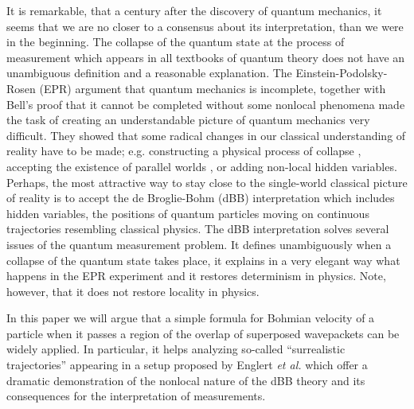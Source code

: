 \documentclass[preprint,tightenlines]{elsarticle}
\begin{document}
It is remarkable, that a century after the discovery of quantum mechanics,
it seems that we are no closer to a consensus about its interpretation,
than we were in the beginning. The collapse of the quantum state at
the process of measurement which appears in all textbooks of quantum
theory does not have an unambiguous definition and a reasonable explanation.
The Einstein-Podolsky-Rosen (EPR) argument \cite{PhysRev.47.777}
that quantum mechanics is incomplete, together with Bell's proof \cite{bell1964einstein}
that it cannot be completed without some nonlocal phenomena made the
task of creating an understandable picture of quantum mechanics very
difficult. They showed that some radical changes in our classical
understanding of reality have to be made; e.g. constructing a physical
process of collapse \cite{Pearle76,PhysRevD.34.470}, accepting the
existence of parallel worlds \cite{vaidman2002many}, or adding non-local
hidden variables. Perhaps, the most attractive way to stay close to
the single-world classical picture of reality is to accept the de
Broglie-Bohm (dBB) interpretation \cite{Broglie28,Bohm52}
which includes  hidden variables, the positions of quantum particles moving on continuous trajectories
resembling classical physics. The dBB interpretation solves several
issues of the quantum measurement problem. It defines unambiguously
when a collapse of the quantum state takes place, it explains
in a very elegant way what happens in the EPR experiment and it restores
determinism in physics. Note, however, that it does not restore locality
in physics.

In this paper we will argue that a simple formula for Bohmian velocity
of a particle when it passes a region of the overlap of superposed
wavepackets can be widely applied. In particular, it helps analyzing
so-called ``surrealistic trajectories'' appearing in a setup proposed
by Englert \textit{et al.} \cite{englert1992surrealistic} which offer
a dramatic demonstration of the nonlocal nature of the dBB theory
and its consequences for the interpretation of measurements.
\end{document}
